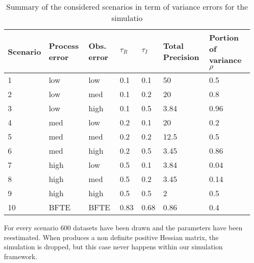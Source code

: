 \begin{table}[htbp]

\begin{center}
\begin{tabular}[t]{lllllll}
Scenario & Process error & Obs. error & $\tau_R$ & $\tau_I$ & Total Precision & Portion of variance $\rho$ \\ \hline
1 & low & low & 0.1 & 0.1 & 50 & 0.5\\
2 & low & med & 0.1 & 0.2 & 20 & 0.8 \\ 
3 & low & high & 0.1 & 0.5 & 3.84 & 0.96 \\ 
4 & med & low & 0.2 & 0.1 & 20 & 0.2\\
5 & med & med & 0.2 & 0.2 & 12.5 & 0.5 \\ 
6 & med & high & 0.2 & 0.5 & 3.45 & 0.86 \\ 
7 & high & low & 0.5 & 0.1 & 3.84 & 0.04\\
8 & high & med & 0.5 & 0.2 & 3.45 & 0.14 \\ 
9 & high & high & 0.5 & 0.5 & 2 & 0.5 \\ 
10 & BFTE & BFTE & 0.83 & 0.68 & 0.86 & 0.4\\ 
\end{tabular}
\end{center}
\caption{Summary of the considered scenarios in term of variance errors for the simulatio }
\end{table}


For every scenario 600 datasets have been drawn and the parameters have been reestimated. When \iscam produces a non definite positive Hessian matrix, the simulation is dropped, but this case never happens within our simulation framework.

